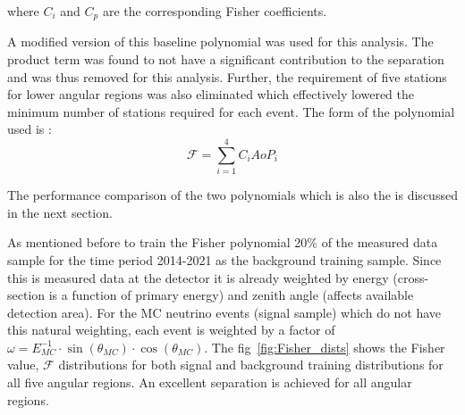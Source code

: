 where $C_i$ and $C_p$ are the corresponding Fisher coefficients. 

A modified version of this baseline polynomial was used for this analysis. The product term was found to not have a significant contribution to the separation and was thus removed for this analysis. Further, the requirement of five stations for lower angular regions was also eliminated which effectively lowered the minimum number of stations required for each event. The form of the polynomial used is : 
\begin{equation}
  \label{eq:fisher_poly_new}
  \mathcal{F} = \sum_{i=1}^{4} C_i AoP_i
\end{equation}

The performance comparison of the two polynomials which is also the is discussed in the next section.

As mentioned before to train the Fisher polynomial 20\% of the measured data sample for the time period 2014-2021 as the background training sample. Since this is measured data at the detector it is already weighted by energy (cross-section is a function of primary energy) and zenith angle (affects available detection area). For the MC neutrino events (signal sample) which do not have this natural weighting, each event is weighted by a factor of $\omega = E_{MC}^{-1} \cdot \sin(\theta_{MC}) \cdot \cos(\theta_{MC})$. The fig~\ref{fig:Fisher_dists} shows the Fisher value, $\mathcal{F}$ distributions for both signal and background training distributions for all five angular regions. An excellent separation is achieved for all angular regions. 

